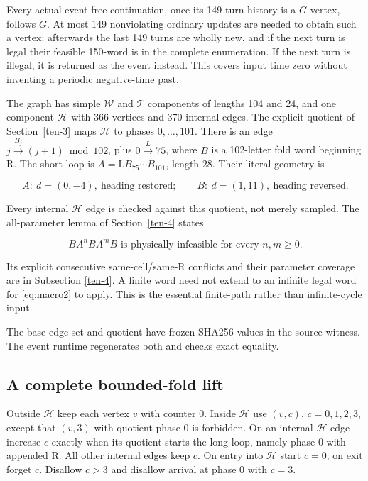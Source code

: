Every actual event-free continuation, once its 149-turn history is a $G$
vertex, follows $G$. At most 149 nonviolating ordinary updates are needed
to obtain such a vertex: afterwards the last 149 turns are wholly new,
and if the next turn is legal their feasible 150-word is in the complete
enumeration. If the next turn is illegal, it is returned as the event
instead. This covers input time zero without inventing a periodic
negative-time past.

The graph has simple $\mathcal W$ and $\mathcal T$ components of lengths 104 and 24,
and one component $\mathcal H$ with 366 vertices and 370 internal edges. The
explicit quotient of Section~\ref{ten-3} maps $\mathcal H$ to phases $0,\ldots,101$. There is an edge
$j\xrightarrow{B_j}(j+1)\bmod102$, plus $0\xrightarrow{L}75$, where $B$ is
a 102-letter fold word beginning R. The short loop is $A=\mathrm L B_{75}\cdots B_{101}$, length 28. Their literal geometry is

\[
A:\ d=(0,-4),\ \text{heading restored};\qquad B:\ d=(1,11),\ \text{heading reversed}.
\]

Every internal $\mathcal H$ edge is checked against this quotient, not merely
sampled. The all-parameter lemma of Section~\ref{ten-4} states

\begin{equation}\label{eq:macro2}
BA^nBA^mB\text{ is physically infeasible for every }n,m\ge0.
\end{equation}

Its explicit consecutive same-cell/same-R conflicts and their parameter
coverage are in Subsection \ref{ten-4}. A finite word need not extend to
an infinite legal word for \eqref{eq:macro2} to apply. This is the essential
finite-path rather than infinite-cycle input.

The base edge set and quotient have frozen SHA256 values in the source
witness. The event runtime regenerates both and checks exact equality.

\subsection{A complete bounded-fold lift}\label{macro-4}

Outside $\mathcal H$ keep each vertex $v$ with counter 0. Inside
$\mathcal H$ use $(v,c)$, $c=0,1,2,3$, except that $(v,3)$ with quotient
phase 0 is forbidden. On an internal $\mathcal H$ edge increase $c$
exactly when its quotient starts the long loop, namely phase 0 with
appended R. All other internal edges keep $c$. On entry into $\mathcal H$
start $c=0$; on exit forget $c$. Disallow $c>3$ and disallow arrival at
phase 0 with $c=3$.

